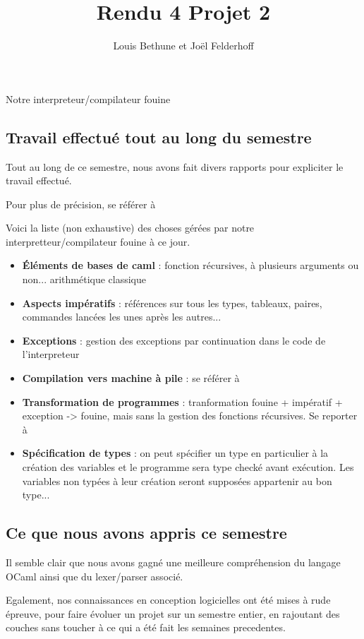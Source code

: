 \documentclass[a4paper,10pt]{report}
\title{Rendu 4 Projet 2}
\author{Louis Bethune et Jo\"el Felderhoff}
\date{}
\begin{document}
\maketitle

\begin{section}{Notre interpreteur/compilateur fouine}

\subsection{Travail effectué tout au long du semestre}
Tout au long de ce semestre, nous avons fait divers rapports pour expliciter le travail effectué.

Pour plus de précision, se référer à \cite{Rapport1} \cite{Rapport2}

Voici la liste (non exhaustive) des choses gérées par notre interpretteur/compilateur fouine à ce jour.

\begin{itemize}
\item \textbf{Éléments de bases de caml} : fonction récursives, à plusieurs arguments ou non... arithmétique classique
\item \textbf{Aspects impératifs} : références sur tous les types, tableaux, paires, commandes lancées les unes après les autres...
\item \textbf{Exceptions} : gestion des exceptions par continuation dans le code de l'interpreteur
\item \textbf{Compilation vers machine à pile} : se référer à \cite{Rapport1}
\item \textbf{Transformation de programmes} : tranformation fouine + impératif + exception -> fouine, mais sans la gestion des fonctions récursives. Se reporter à \cite{Rapport2}
\item \textbf{Spécification de types} : on peut spécifier un type en particulier à la création des variables et le programme sera type checké avant exécution. Les variables non typées à leur création seront supposées appartenir au bon type...
\end{itemize}

\subsection{Ce que nous avons appris ce semestre}
Il semble clair que nous avons gagné une meilleure compréhension du langage OCaml ainsi que du lexer/parser associé.

Egalement, nos connaissances en conception logicielles ont été mises à rude épreuve, pour faire évoluer un projet sur un semestre entier, en rajoutant des couches sans toucher à ce qui a été fait les semaines precedentes.


\end{section}
\end{document}
